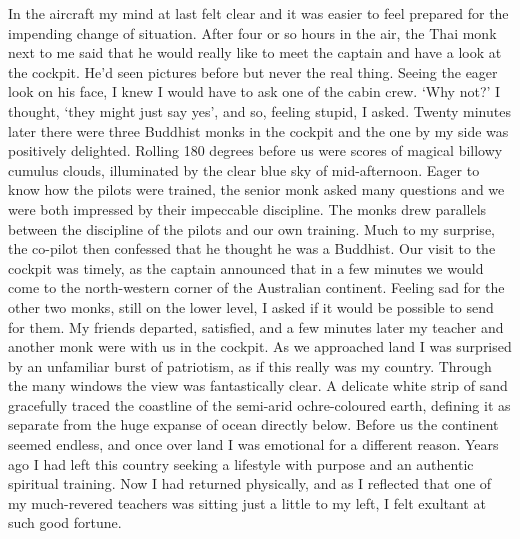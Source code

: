 In the aircraft my mind at last felt clear and it was easier to feel
prepared for the impending change of situation. After four or so hours
in the air, the Thai monk next to me said that he would really like to
meet the captain and have a look at the cockpit. He'd seen pictures
before but never the real thing. Seeing the eager look on his face, I
knew I would have to ask one of the cabin crew. `Why not?' I thought,
`they might just say yes', and so, feeling stupid, I asked. Twenty
minutes later there were three Buddhist monks in the cockpit and the one
by my side was positively delighted. Rolling 180 degrees before us were
scores of magical billowy cumulus clouds, illuminated by the clear blue
sky of mid-afternoon. Eager to know how the pilots were trained, the
senior monk asked many questions and we were both impressed by their
impeccable discipline. The monks drew parallels between the discipline
of the pilots and our own training. Much to my surprise, the co-pilot
then confessed that he thought he was a Buddhist. Our visit to the
cockpit was timely, as the captain announced that in a few minutes we
would come to the north-western corner of the Australian continent.
Feeling sad for the other two monks, still on the lower level, I asked
if it would be possible to send for them. My friends departed,
satisfied, and a few minutes later my teacher and another monk were with
us in the cockpit. As we approached land I was surprised by an
unfamiliar burst of patriotism, as if this really was my country.
Through the many windows the view was fantastically clear. A delicate
white strip of sand gracefully traced the coastline of the semi-arid
ochre-coloured earth, defining it as separate from the huge expanse of
ocean directly below. Before us the continent seemed endless, and once
over land I was emotional for a different reason. Years ago I had left
this country seeking a lifestyle with purpose and an authentic spiritual
training. Now I had returned physically, and as I reflected that one of
my much-revered teachers was sitting just a little to my left, I felt
exultant at such good fortune.


